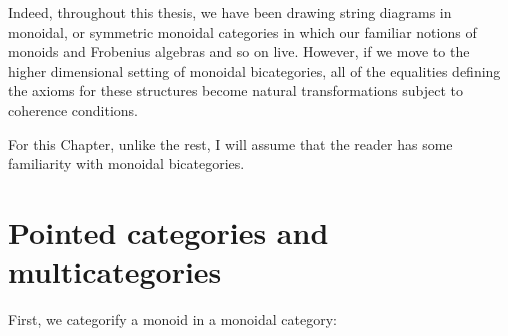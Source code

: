 Indeed, throughout this thesis, we have been drawing string diagrams in monoidal, or symmetric monoidal categories in which our familiar notions of monoids and Frobenius algebras and so on live.  However, if we move to the higher dimensional setting of monoidal bicategories, all of the equalities defining the axioms for these structures become natural transformations subject to  coherence conditions.   


For this Chapter, unlike the rest, I will assume that the reader has some familiarity with monoidal bicategories.


\section{Pointed categories and multicategories}

 First, we categorify a monoid in a monoidal category:

